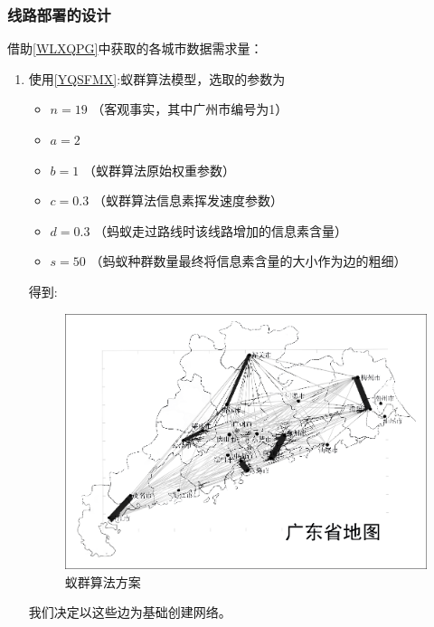 \documentclass[UTF8,12pt]{ctexart}
\begin{document}
        \subsubsection[线路部署位置]{线路部署的设计}    
            \noindent 借助\ref{WLXQPG}中获取的各城市数据需求量：
            \begin{enumerate}
                \item 使用\ref{YQSFMX}:蚁群算法模型，选取的参数为
                    \begin{itemize}
                        \item $n=19$ （客观事实，其中广州市编号为1）
                        \item $a=2$
                        \item $b=1$ （蚁群算法原始权重参数）
                        \item $c=0.3$ （蚁群算法信息素挥发速度参数）
                        \item $d=0.3$ （蚂蚁走过路线时该线路增加的信息素含量）
                        \item $s=50$ （蚂蚁种群数量最终将信息素含量的大小作为边的粗细）
                    \end{itemize}
                得到:
                    \begin{figure}[H]
                      \centering
                      \includegraphics[scale=0.32]{YQSF.png}   %
                      \caption{蚁群算法方案}
                      \end{figure}
                我们决定以这些边为基础创建网络。


\end{enumerate}
\end{document}
